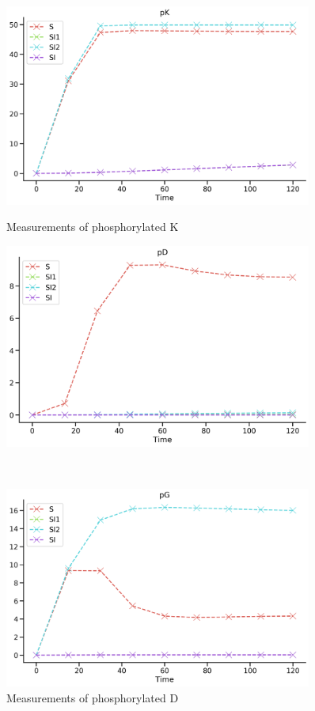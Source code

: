 \documentclass[../../main]{subfiles}
\begin{document}
    \begin{figure}
        \centering
        \begin{minipage}{0.45\textwidth}
            \centering
            \includegraphics[width=0.9\textwidth]{ODEModels/PracticeProject/pK.png} %
            \caption{Measurements of phosphorylated K}
        \end{minipage}\hfill
        \begin{minipage}{0.45\textwidth}
            \centering
            \includegraphics[width=0.9\textwidth]{ODEModels/PracticeProject/pD.png} %
            \caption{Measurements of phosphorylated D}
        \end{minipage}\\%
        \begin{minipage}{0.45\textwidth}
            \centering
            \includegraphics[width=0.9\textwidth]{ODEModels/PracticeProject/pG.png} %

\end{minipage}
\end{figure}
\end{document}
